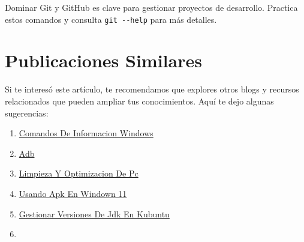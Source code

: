 \documentclass[
  doc,
  floatsintext,
  longtable,
  a4paper,
  nolmodern,
  notxfonts,
  notimes,
  colorlinks=true,linkcolor=blue,citecolor=blue,urlcolor=blue]{apa7}
\providecommand{\tightlist}{%
  \setlength{\itemsep}{0pt}\setlength{\parskip}{0pt}}
\begin{document}
Dominar Git y GitHub es clave para gestionar proyectos de desarrollo.
Practica estos comandos y consulta \texttt{git\ -\/-help} para más
detalles.

\section{Publicaciones Similares}\label{publicaciones-similares}

Si te interesó este artículo, te recomendamos que explores otros blogs y
recursos relacionados que pueden ampliar tus conocimientos. Aquí te dejo
algunas sugerencias:

\begin{enumerate}
\def\labelenumi{\arabic{enumi}.}
\tightlist
\item
  \href{https://achalmaedison.netlify.app/tecnologia-seguridad/operating-system/2017-05-21-comandos-de-informacion-windows/index.pdf}{}
  \href{https://achalmaedison.netlify.app/tecnologia-seguridad/operating-system/2017-05-21-comandos-de-informacion-windows}{Comandos
  De Informacion Windows}
\item
  \href{https://achalmaedison.netlify.app/tecnologia-seguridad/operating-system/2019-06-19-adb/index.pdf}{}
  \href{https://achalmaedison.netlify.app/tecnologia-seguridad/operating-system/2019-06-19-adb}{Adb}
\item
  \href{https://achalmaedison.netlify.app/tecnologia-seguridad/operating-system/2021-08-17-limpieza-y-optimizacion-de-pc/index.pdf}{}
  \href{https://achalmaedison.netlify.app/tecnologia-seguridad/operating-system/2021-08-17-limpieza-y-optimizacion-de-pc}{Limpieza
  Y Optimizacion De Pc}
\item
  \href{https://achalmaedison.netlify.app/tecnologia-seguridad/operating-system/2021-10-21-usando-apk-en-windown-11/index.pdf}{}
  \href{https://achalmaedison.netlify.app/tecnologia-seguridad/operating-system/2021-10-21-usando-apk-en-windown-11}{Usando
  Apk En Windown 11}
\item
  \href{https://achalmaedison.netlify.app/tecnologia-seguridad/operating-system/2022-05-12-gestionar-versiones-de-jdk-en-kubuntu/index.pdf}{}
  \href{https://achalmaedison.netlify.app/tecnologia-seguridad/operating-system/2022-05-12-gestionar-versiones-de-jdk-en-kubuntu}{Gestionar
  Versiones De Jdk En Kubuntu}
\item
  \href{https://achalmaedison.netlify.app/tecnologia-seguridad/operating-system/2022-07-21-instalar-tor-browser/index.pdf}{}

\end{enumerate}
\end{document}
